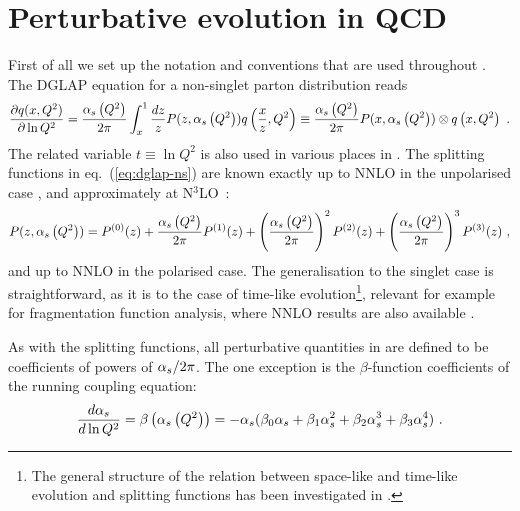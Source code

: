 \section{Perturbative evolution in QCD}
\label{sec:pqcd}
First of all we set up the notation and
conventions that are used throughout \hoppet. The DGLAP
equation for a non-singlet parton distribution reads
\begin{equation}
  \label{eq:dglap-ns}
  \frac{\partial q(x,Q^2)}{\partial \ln Q^2} = 
\frac{\alpha_s\left( Q^2 \right)}{2\pi}\int_x^1 \frac{dz}{z}
  P(z,\alpha_s\left( Q^2 \right)) q\left( \frac{x}{z},Q^2\right) \equiv 
\frac{\alpha_s\left( Q^2 \right)}{2\pi}  P(x,\alpha_s\left( Q^2 \right)) \otimes q\left( x,Q^2\right) \ .
\end{equation}
The related variable $t\equiv \ln Q^2$ is also used
in various places in \hoppet.
The splitting functions in eq.~(\ref{eq:dglap-ns})
are known exactly up to NNLO in the 
unpolarised case \cite{Furmanski:1980cm,Curci:1980uw,NNLO-NS,NNLO-singlet}, and approximately at N$^3$LO~\cite{Gracey:1994nn,Davies:2016jie,Moch:2017uml,Gehrmann:2023cqm,Falcioni:2023tzp,Gehrmann:2023iah,McGowan:2022nag,NNPDF:2024nan,Moch:2021qrk,Falcioni:2023luc,Falcioni:2023vqq,Moch:2023tdj,Falcioni:2024xyt,Falcioni:2024qpd}:
\begin{equation}
  \label{eq:dpdf}
   P(z,\alpha_s\left( Q^2 \right))=P^{(0)}(z)+\frac{\alpha_s\left( Q^2 \right)}{2\pi}P^{(1)}(z)+
\left( \frac{\alpha_s\left( Q^2 \right)}{2\pi} \right)^2 P^{(2)}(z) 
+
\left( \frac{\alpha_s\left( Q^2 \right)}{2\pi} \right)^3 P^{(3)}(z) \ ,
\end{equation}
and up to NNLO \cite{Mertig:1995ny,Vogelsang:1996im,Moch:2014sna,Moch:2015usa,Blumlein:2021enk,Blumlein:2021ryt} in the polarised case.
The generalisation to the singlet case is straightforward, as it
is 
to the case of time-like evolution\footnote{
The general structure of the relation between space-like
and time-like evolution and splitting functions
 has been investigated in \cite{Furmanski:1980cm,Curci:1980uw,Stratmann:1996hn,Dokshitzer:2005bf,Mitov:2006ic,Basso:2006nk,Dokshitzer:2006nm,Beccaria:2007bb}.}, 
relevant for example for fragmentation function analysis,
where NNLO results
are also available \cite{Mitov:2006ic,Moch:2007tx,Almasy:2011eq}.


As with the splitting functions, all perturbative quantities in
\hoppet are defined to be coefficients of powers of $\alpha_s/2\pi$. The one
exception is the $\beta$-function coefficients of the running
coupling equation:
\begin{equation}
  \label{eq:as-ev}
  \frac{d\alpha_s}{d\ln Q^2} = \beta\left( \alpha_s\left( Q^2 \right)\right) = -\alpha_s (\beta_0\alpha_s +
  \beta_1\alpha_s^2 + 
  \beta_2\alpha_s^3 + 
  \beta_3\alpha_s^4) \ .
\end{equation}

